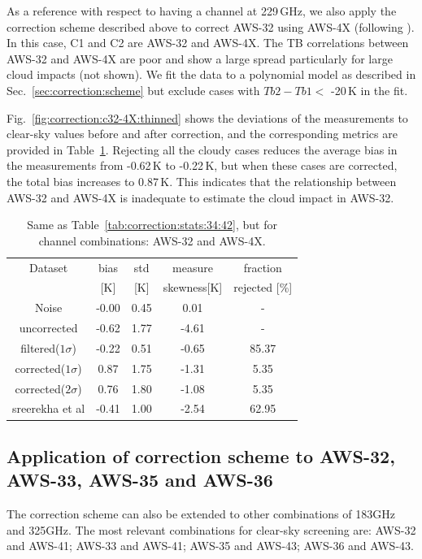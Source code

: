 \documentclass[12pt]{article}
\begin{document}
As a reference with respect to having a channel at 229\,GHz, we also apply the
correction scheme described above to correct AWS-32 using AWS-4X (following
\citet{rekha2012potential}). In this case, C1 and C2 are AWS-32 and AWS-4X. The
TB correlations between AWS-32 and AWS-4X are poor and show a large spread
particularly for large cloud impacts (not shown). We fit the data to a polynomial model as described in Sec.~\ref{sec:correction:scheme} but exclude cases with $Tb2-Tb1 <$ -20\,K in the fit.

Fig.~\ref{fig:correction:c32-4X:thinned} shows the deviations of the measurements to
clear-sky values before and after correction, and the corresponding metrics are
provided in Table~\ref{tab:correction:stats:32:4X}. Rejecting all the cloudy cases reduces the average bias in the measurements from -0.62\,K to -0.22\,K, but when these cases are corrected, the total bias increases to 0.87\,K. This indicates that the relationship between AWS-32 and AWS-4X is inadequate to estimate the cloud impact in AWS-32.
% 
\begin{table}[!h]
	\centering
	\begin{tabular}[b]{c|c|c|c|c}
		Dataset  		  &   bias &   std &   measure & fraction \\
						&   [K]  &   [K] & skewness[K] 		& rejected [\%]\\
		\hline
Noise             		&  -0.00 &  0.45 &               0.01 &                - \\
uncorrected       		&  -0.62 &  1.77 &              -4.61 &                - \\
filtered($1\sigma$)  	&  -0.22 &  0.51 &              -0.65 &               85.37 \\
corrected($1\sigma$) 	&   0.87 &  1.75 &              -1.31 &                5.35 \\
corrected($2\sigma$) 	&   0.76 &  1.80 &              -1.08 &                5.35 \\
sreerekha et al   		&  -0.41 &  1.00 &              -2.54 &               62.95 \\
		\hline
	\end{tabular}
	\caption{Same as Table~\ref{tab:correction:stats:34:42}, but for channel combinations: AWS-32 and AWS-4X.   }
	\label{tab:correction:stats:32:4X}
\end{table}

\subsection{Application of correction scheme to AWS-32, AWS-33, AWS-35 and AWS-36}
%
The correction scheme can also be extended to other combinations of 183GHz and
325GHz. The most relevant combinations for clear-sky screening are: AWS-32 and
AWS-41; AWS-33 and AWS-41; AWS-35 and AWS-43; AWS-36 and AWS-43.
\end{document}
